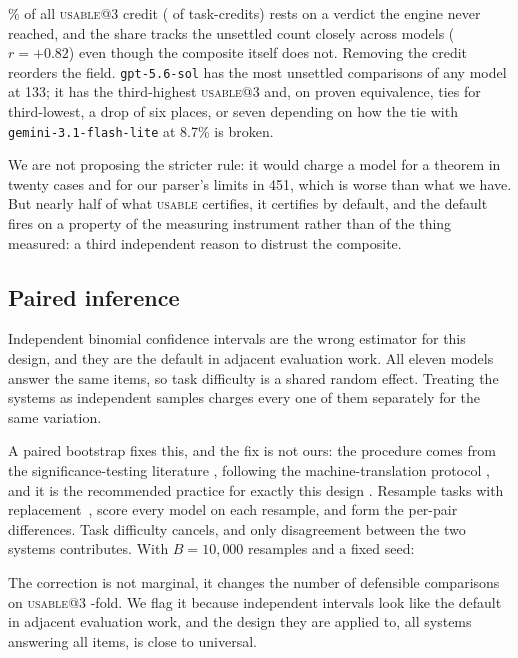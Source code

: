 \documentclass[11pt]{article}
\newcommand{\usable}{\textsc{usable}}
\begin{document}
\undecshare{}\% of all \usable{}@3 credit (\undecsupported{} of
\undecusable{} task-credits) rests on a verdict the engine never reached,
and the share tracks the unsettled count closely across models ($r = +0.82$)
even though the composite itself does not. Removing the credit reorders the
field. \texttt{gpt-5.6-sol} has the most unsettled comparisons of any model at
133; it has the third-highest \usable{}@3 and, on proven equivalence, ties for
third-lowest, a drop of six places, or seven depending on how the tie with
\texttt{gemini-3.1-flash-lite} at 8.7\% is broken.

We are not proposing the stricter rule: it would charge a model for a theorem
in twenty cases and for our parser's limits in 451, which is worse than what
we have. But nearly half of what \usable{} certifies, it certifies by
default, and the default fires on a property of the measuring instrument
rather than of the thing measured: a third independent reason to distrust
the composite.

\subsection{Paired inference}
\label{sec:paired}

Independent binomial confidence intervals are the wrong estimator for this
design, and they are the default in adjacent evaluation work. All eleven
models answer the same items, so task difficulty is a shared random effect. Treating
the systems as independent samples charges every one of them separately for
the same variation.

A paired bootstrap fixes this, and the fix is not ours: the procedure comes
from the significance-testing literature \citep{bergkirkpatrick2012empirical},
following the machine-translation protocol \citep{koehn2004bootstrap}, and it
is the recommended practice for exactly this design \citep{dror2018hitchhiker}. Resample
tasks with replacement~\citep{efron1994bootstrap}, score every
model on each resample, and form the per-pair differences. Task difficulty
cancels, and only disagreement between the two systems contributes. With $B = 10{,}000$
resamples and a fixed seed:

\begin{table}[htbp]
\centering
\small

\caption{Resolvable pairwise comparisons under independent versus paired
inference on identical data.}
\label{tab:paired}
\end{table}

The correction is not marginal, it changes the number of defensible
comparisons on \usable{}@3 \resolvedusable{}-fold. We flag it because independent
intervals look like the default in adjacent evaluation work, and the design
they are applied to, all systems answering all items, is close to universal.
\end{document}
